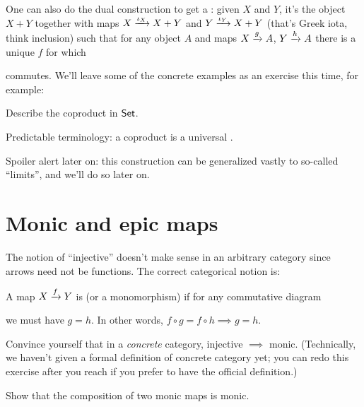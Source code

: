 One can also do the dual construction to get a :
given $X$ and $Y$, it's the object $X+Y$
together with maps $X \xrightarrow{\iota_X} X+Y$ and $Y \xrightarrow{\iota_Y} X+Y$
(that's Greek iota, think inclusion)
such that for any object $A$ and maps $X \xrightarrow{g} A$, $Y \xrightarrow{h} A$
there is a unique $f$ for which
\begin{center}
\end{center}
commutes.
We'll leave some of the concrete examples as an exercise this time,
for example:
\begin{exercise}
	Describe the coproduct in $\mathsf{Set}$.
\end{exercise}
Predictable terminology: a coproduct is a universal .

Spoiler alert later on:
this construction can be generalized vastly to so-called ``limits'',
and we'll do so later on.

\section{Monic and epic maps}
The notion of ``injective'' doesn't make sense
in an arbitrary category since arrows need not be functions.
The correct categorical notion is:
\begin{definition}
	A map $X \xrightarrow{f} Y$ is 
	(or a monomorphism) if for any commutative diagram
	\begin{center}
	\end{center}
	we must have $g = h$.
	In other words, $f \circ g = f \circ h \implies g = h$.
\end{definition}
\begin{ques}
	Convince yourself that in a \emph{concrete} category, injective $\implies$ monic.
	(Technically, we haven't given a formal definition of concrete category yet;
	you can redo this exercise after you reach 
	if you prefer to have the official definition.)
\end{ques}
\begin{ques}
	Show that the composition of two monic maps is monic.
\end{ques}

